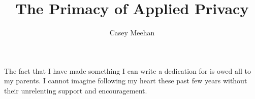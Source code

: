 \documentclass[12pt]{ucsddissertation}
\title{The Primacy of Applied Privacy}
\author{Casey Meehan}
\begin{document}
\frontmatter
\maketitle
\makecopyright
\makesignature
\begin{dedication}
\setsinglespacing
\raggedright %
\parindent0pt\parskip\baselineskip
The fact that I have made something I can write a dedication for is owed all to my parents. I cannot imagine following my heart these past few years without their unrelenting support and encouragement. 
\end{dedication}

%
%

\tableofcontents
\listoffigures
\listoftables

\end{document}
